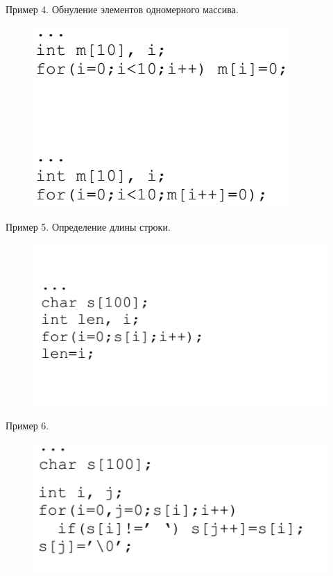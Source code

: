 \documentclass{beamer}
\begin{document}
\begin{frame}
Пример 4. Обнуление элементов одномерного массива. 
\begin{figure}[h]
\centering
\includegraphics[scale=0.5]{images/lec02-pic08.png}
\end{figure}
\end{frame}

\begin{frame}
Пример 5. Определение длины строки. 
\begin{figure}[h]
\centering
\includegraphics[scale=0.5]{images/lec02-pic09.png}
\end{figure}
\end{frame}

\begin{frame}
Пример 6. 
\begin{figure}[h]
\centering
\includegraphics[scale=0.5]{images/lec02-pic10.png}
\end{figure}
\end{frame}
\end{document}

